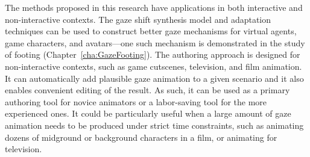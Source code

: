 The methods proposed in this research have applications in both interactive and non-interactive contexts. The gaze shift synthesis model and adaptation techniques can be used to construct better gaze mechanisms for virtual agents, game characters, and avatars---one such mechanism is demonstrated in the study of footing (Chapter~\ref{cha:GazeFooting}). The authoring approach is designed for non-interactive contexts, such as game cutscenes, television, and film animation. It can automatically add plausible gaze animation to a given scenario and it also enables convenient editing of the result. As such, it can be used as a primary authoring tool for novice animators or a labor-saving tool for the more experienced ones. It could be particularly useful when a large amount of gaze animation needs to be produced under strict time constraints, such as animating dozens of midground or background characters in a film, or animating for television.
